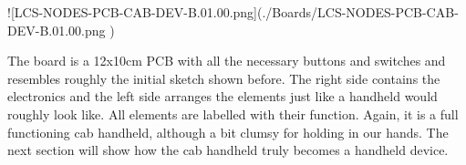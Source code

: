 ![LCS-NODES-PCB-CAB-DEV-B.01.00.png](./Boards/LCS-NODES-PCB-CAB-DEV-B.01.00.png )

The board is a 12x10cm PCB with all the necessary buttons and switches and resembles roughly the initial sketch shown before. The right side contains the electronics and the left side arranges the elements just like a handheld would roughly look like. All elements are labelled with their function. Again, it is a full functioning cab handheld, although a bit clumsy for holding in our hands. The next section will show how the cab handheld truly becomes a handheld device.
